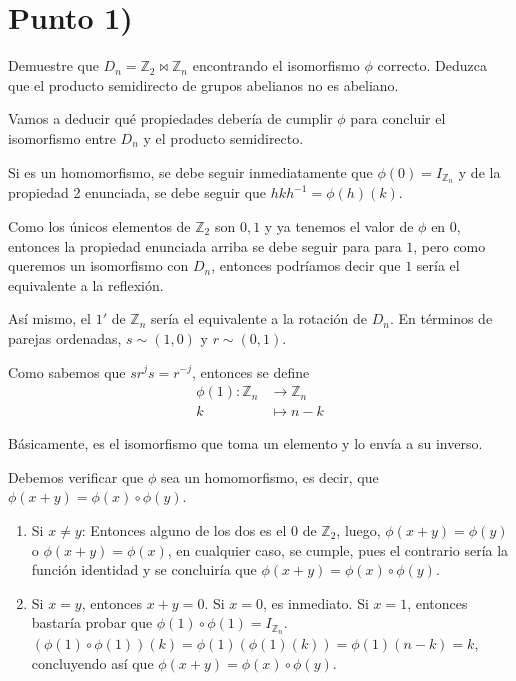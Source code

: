 \documentclass{article}
\begin{document}
  \section{Punto 1)}
      Demuestre que $D_n = \mathbb{Z}_2 \Join \mathbb{Z}_n$ encontrando el isomorfismo 
      $\phi$ correcto. Deduzca que el producto semidirecto de grupos abelianos no es abeliano.

      Vamos a deducir qué propiedades debería de cumplir $\phi$ para concluir el 
      isomorfismo entre $D_n$ y el producto semidirecto.

      Si es un homomorfismo, se debe seguir inmediatamente que $\phi(0) = I_{\mathbb{Z}_n}$ y 
      de la propiedad 2 enunciada, se debe seguir que $h k h^{-1} = \phi(h)(k)$. 

      Como los únicos elementos de $\mathbb{Z}_2$ son $0, 1$ y ya tenemos el valor de 
      $\phi$ en $0$, entonces la propiedad enunciada arriba se debe seguir para para 
      $1$, pero como queremos un isomorfismo con $D_n$, entonces podríamos decir que 
      $1$ sería el equivalente a la reflexión. 

      Así mismo, el $1'$ de $\mathbb{Z}_n$ sería el equivalente a la rotación de $D_n$. En 
      términos de parejas ordenadas, $s \sim (1, 0)$ y $r \sim (0, 1)$. 

      Como sabemos que $s r^j s = r^{-j}$, entonces se define
      \begin{equation*}
        \begin{aligned}
          \phi(1): \mathbb{Z}_n &\to \mathbb{Z}_n \\
          k &\mapsto n - k 
        \end{aligned}
      \end{equation*}

      Básicamente, es el isomorfismo que toma un elemento y lo envía a su inverso.

      Debemos verificar que $\phi$ sea un homomorfismo, es decir, que $\phi(x + y) = \phi(x) \circ \phi(y)$.

      \begin{enumerate}[label=(\alph*)]
        \item Si $x \neq y$: Entonces alguno de los dos es el $0$ de $\mathbb{Z}_2$, luego, 
              $\phi(x + y) = \phi(y)$ o $\phi(x + y) = \phi(x)$, en cualquier caso, se cumple,
              pues el contrario sería la función identidad y se concluiría que 
              $\phi(x + y) = \phi(x) \circ \phi(y)$.

        \item Si $x = y$, entonces $x + y = 0$. Si $x = 0$, es inmediato. Si $x = 1$, entonces 
              bastaría probar que $\phi(1) \circ \phi(1) = I_{\mathbb{Z}_n}$. 
              $(\phi(1) \circ \phi(1)) (k) = \phi(1)(\phi(1)(k)) = \phi(1)(n-k) = k$, concluyendo así que 
              $\phi(x + y) = \phi(x) \circ \phi(y)$.
      \end{enumerate}
\end{document}
